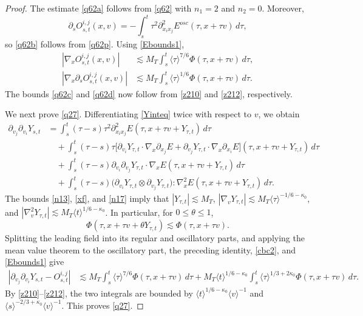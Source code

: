 \documentclass[reqno,11pt]{amsart}
\numberwithin{equation}{section}
\begin{document}
	\begin{proof}
The estimate \eqref{q62a} follows from \eqref{q62} with
$n_1=2$ and $n_2=0$. Moreover,
\[
	\partial_sO_{s,t}^{i,j}(x,v)
	=
	-\int_s^t\tau^2
	\partial_{x_ix_j}^2E^{osc}(\tau,x+\tau v)\,d\tau,
\]
so \eqref{q62b} follows from \eqref{q62p}. Using \eqref{Ebounds1},
\begin{align*}
	|\nabla_xO_{s,t}^{i,j}(x,v)|
	&\lesssim
	M_T\int_s^t\langle\tau\rangle^{7/6}
	\Phi(\tau,x+\tau v)\,d\tau,\\
	|\nabla_x\partial_sO_{s,t}^{i,j}(x,v)|
	&\lesssim
	M_T\int_s^t\langle\tau\rangle^{1/6}
	\Phi(\tau,x+\tau v)\,d\tau.
\end{align*}
The bounds \eqref{q62c} and \eqref{q62d} now follow from
\eqref{z210} and \eqref{z212}, respectively.

We next prove \eqref{q27}. Differentiating \eqref{Yinteq} twice
with respect to $v$, we obtain
\begin{align*}
	\partial_{v_j}\partial_{v_i}Y_{s,t}
	&=\int_s^t(\tau-s)\tau^2
	\partial_{x_ix_j}^2E(\tau,x+\tau v+Y_{\tau,t})\,d\tau\\
	&\quad+\int_s^t(\tau-s)\tau
	\Big[
	\partial_{v_i}Y_{\tau,t}\cdot\nabla_x\partial_{x_j}E
	+\partial_{v_j}Y_{\tau,t}\cdot\nabla_x\partial_{x_i}E
	\Big](\tau,x+\tau v+Y_{\tau,t})\,d\tau\\
	&\quad+\int_s^t(\tau-s)
	\partial_{v_i}\partial_{v_j}Y_{\tau,t}\cdot
	\nabla_xE(\tau,x+\tau v+Y_{\tau,t})\,d\tau\\
	&\quad+\int_s^t(\tau-s)
	\big(\partial_{v_i}Y_{\tau,t}\otimes\partial_{v_j}Y_{\tau,t}\big)
	:\nabla_x^2E(\tau,x+\tau v+Y_{\tau,t})\,d\tau.
\end{align*}
The bounds \eqref{n13}, \eqref{xf}, and \eqref{n17} imply that $|Y_{\tau,t}|\lesssim M_T$, $|\nabla_vY_{\tau,t}|\lesssim M_T\langle\tau\rangle^{-1/6-\kappa_0}$, and $|\nabla_v^2Y_{\tau,t}|\lesssim M_T\langle t\rangle^{1/6-\kappa_0}$. 
In particular, for $0\leq\theta\leq1$,
\[
	\Phi(\tau,x+\tau v+\theta Y_{\tau,t})
	\lesssim\Phi(\tau,x+\tau v).
\]
Splitting the leading field into its regular and oscillatory
parts, and applying the mean value theorem to the oscillatory part,
the preceding identity, \eqref{cbc2}, and \eqref{Ebounds1} give
\begin{align*}
	\left|\partial_{v_j}\partial_{v_i}Y_{s,t}-O_{s,t}^{i,j}\right|
	&\lesssim M_T\int_s^t\langle\tau\rangle^{7/6}\Phi(\tau,x+\tau v)\,d\tau+ M_T\langle t\rangle^{1/6-\kappa_0}
	\int_s^t\langle\tau\rangle^{1/3+2\kappa_0}\Phi(\tau,x+\tau v)\,d\tau.
\end{align*}
By \eqref{z210}--\eqref{z212}, the two integrals are bounded by $\langle t\rangle^{1/6-\kappa_0}\langle v\rangle^{-1}$ and $\langle s\rangle^{-2/3+\kappa_0}\langle v\rangle^{-1}$. This proves \eqref{q27}.


\end{proof}
\end{document}
